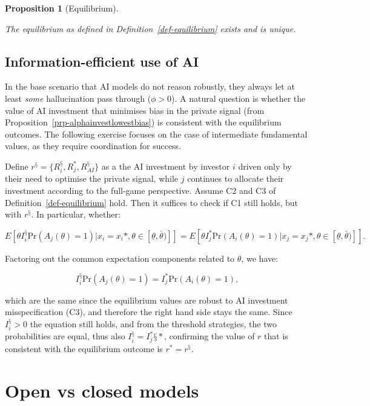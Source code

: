 \documentclass[
]{article}
\theoremstyle{definition}
\theoremstyle{plain}
\newtheorem{proposition}{Proposition}[section]
\theoremstyle{remark}
\begin{document}
\begin{proposition}[Equilibrium]\protect\hypertarget{prp-equilibrium}{}\label{prp-equilibrium}

The equilibrium as defined in Definition~\ref{def-equilibrium} exists
and is unique.

\end{proposition}

\subsection{Information-efficient use of
AI}\label{information-efficient-use-of-ai}

In the base scenario that AI models do not reason robustly, they always
let at least \emph{some} hallucination pass through (\(\phi > 0\)). A
natural question is whether the value of AI investment that minimises
bias in the private signal (from
Proposition~\ref{prp-alphainvestlowestbias}) is consistent with the
equilibrium outcomes. The following exercise focuses on the case of
intermediate fundamental values, as they require coordination for
success.

Define \(r^§ = \{R_i^§, R_j^*, R_{AI}^§\}\) as a the AI investment by
investor \(i\) driven only by their need to optimise the private signal,
while \(j\) continues to allocate their investment according to the
full-game perspective. Assume C2 and C3 of
Definition~\ref{def-equilibrium} hold. Then it suffices to check if C1
still holds, but with \(r^§\). In particular, whether:

\[
E[\theta I_i^§ \text{Pr}(A_j(\theta)=1) | x_i = x_i*, \theta \in [\underline{\theta}, \bar{\theta})]] = E[\theta I_j^* \text{Pr}(A_i(\theta)=1) | x_j = x_j*, \theta \in [\underline{\theta}, \bar{\theta})]].
\]

Factoring out the common expectation components related to \(\theta\),
we have:

\[
I_i^§ \text{Pr}(A_j(\theta)=1) = I_j^* \text{Pr}(A_i(\theta)=1),
\]

which are the same since the equilibrium values are robust to AI
investment misspecification (C3), and therefore the right hand side
stays the same. Since \(I_i^§ > 0\) the equation still holds, and from
the threshold strategies, the two probabilities are equal, thus also
\(I_i^§ = I_j^*§*\), confirming the value of \(r\) that is consistent
with the equilibrium outcome is \(r^* = r^§\).

\section{Open vs closed models}\label{sec-closedmodels}
\end{document}
